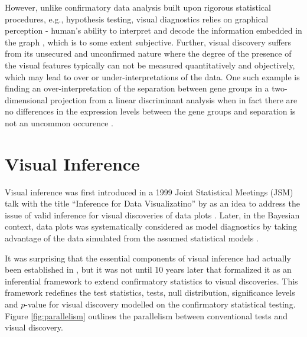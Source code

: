 \documentclass{monashthesis}
\theoremstyle{definition}
\theoremstyle{definition}
\theoremstyle{definition}
\theoremstyle{definition}
\theoremstyle{remark}
\begin{document}
However, unlike confirmatory data analysis built upon rigorous statistical procedures, e.g., hypothesis testing, visual diagnostics relies on graphical perception - human's ability to interpret and decode the information embedded in the graph \autocite{cleveland_graphical_1984}, which is to some extent subjective. Further, visual discovery suffers from its unsecured and unconfirmed nature where the degree of the presence of the visual features typically can not be measured quantitatively and objectively, which may lead to over or under-interpretations of the data. One such example is finding an over-interpretation of the separation between gene groups in a two-dimensional projection from a linear discriminant analysis when in fact there are no differences in the expression levels between the gene groups and separation is not an uncommon occurence \autocite{roy_chowdhury_using_2015}.

\hypertarget{visual-inference}{%
\section{Visual Inference}\label{visual-inference}}

Visual inference was first introduced in a 1999 Joint Statistical Meetings (JSM) talk with the title ``Inference for Data Visualizatino'' by \textcite{buja_inference_1999} as an idea to address the issue of valid inference for visual discoveries of data plots \autocite{gelman_exploratory_2004}. Later, in the Bayesian context, data plots was systematically considered as model diagnostics by taking advantage of the data simulated from the assumed statistical models \autocite{gelman_bayesian_2003,gelman_exploratory_2004}.

It was surprising that the essential components of visual inference had actually been established in \textcite{buja_inference_1999}, but it was not until 10 years later that \textcite{buja_statistical_2009} formalized it as an inferential framework to extend confirmatory statistics to visual discoveries. This framework redefines the test statistics, tests, null distribution, significance levels and \(p\)-value for visual discovery modelled on the confirmatory statistical testing. Figure \ref{fig:parallelism} outlines the parallelism between conventional tests and visual discovery.
\end{document}
